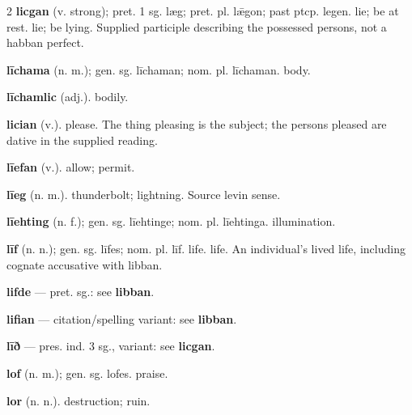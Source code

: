 \begin{multicols*}{2}
\textbf{licgan} (v. strong); pret. 1 sg. læg; pret. pl. lǣgon; past ptcp. legen. lie; be at rest. lie; be lying. Supplied participle describing the possessed persons, not a habban perfect.\par
\textbf{līchama} (n. m.); gen. sg. līchaman; nom. pl. līchaman. body.\par
\textbf{līchamlic} (adj.). bodily.\par
\textbf{lician} (v.). please. The thing pleasing is the subject; the persons pleased are dative in the supplied reading.\par
\textbf{līefan} (v.). allow; permit.\par
\textbf{līeg} (n. m.). thunderbolt; lightning. Source levin sense.\par
\textbf{līehting} (n. f.); gen. sg. līehtinge; nom. pl. līehtinga. illumination.\par
\textbf{līf} (n. n.); gen. sg. līfes; nom. pl. līf. life. life. An individual's lived life, including cognate accusative with libban.\par
\textbf{lifde} — pret. sg.: see \textbf{libban}.\par
\textbf{lifian} — citation/spelling variant: see \textbf{libban}.\par
\textbf{līð} — pres. ind. 3 sg., variant: see \textbf{licgan}.\par
\textbf{lof} (n. m.); gen. sg. lofes. praise.\par
\textbf{lor} (n. n.). destruction; ruin.\par

\end{multicols*}
